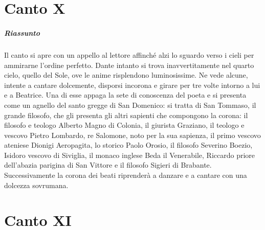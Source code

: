 \documentclass[a4paper, twoside, titlepage]{book}
\begin{document}
\chapter{Canto X}

\paragraph{Riassunto} Il canto si apre con un appello al lettore affinché alzi lo sguardo verso i cieli per ammirarne l'ordine perfetto. Dante intanto si trova inavvertitamente nel quarto cielo, quello del Sole, ove le anime risplendono luminosissime. Ne vede alcune, intente a cantare dolcemente, disporsi incorona e girare per tre volte intorno a lui e a Beatrice. Una di esse appaga la sete di conoscenza del poeta e si presenta come un agnello del santo gregge di San Domenico: si tratta di San Tommaso, il grande filosofo, che gli presenta gli altri sapienti che compongono la corona: il filosofo e teologo Alberto Magno di Colonia, il giurista Graziano, il teologo e vescovo Pietro Lombardo, re Salomone, noto per la sua sapienza, il primo vescovo ateniese Dionigi Aeropagita, lo storico Paolo Orosio, il filosofo Severino Boezio, Isidoro vescovo di Siviglia, il monaco inglese Beda il Venerabile, Riccardo priore dell'abazia parigina di San Vittore e il filosofo Sigieri di Brabante. Successivamente la corona dei beati riprenderà a danzare e a cantare con una dolcezza sovrumana.

\chapter{Canto XI}
\end{document}
